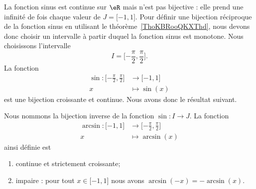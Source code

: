 	La fonction sinus est continue sur \( \eR\) mais n'est pas bijective : elle prend une infinité de fois chaque valeur de \( J=\mathopen[ -1 , 1 \mathclose]\). Pour définir une bijection réciproque de la fonction sinus en utilisant le théorème~\ref{ThoKBRooQKXThd}, nous devons donc choisir un intervalle à partir duquel la fonction sinus est monotone. Nous choisissons l'intervalle
	\begin{equation}
		I=\mathopen[ -\frac{ \pi }{ 2 } , \frac{ \pi }{2} \mathclose].
	\end{equation}
	La fonction
	\begin{equation}
		\begin{aligned}
			\sin\colon \mathopen[ -\frac{ \pi }{2} , \frac{ \pi }{2} \mathclose] & \to \mathopen[ -1 , 1 \mathclose] \\
			x                                                                    & \mapsto \sin(x)
		\end{aligned}
	\end{equation}
	est une bijection croissante et continue. Nous avons donc le résultat suivant.
	\begin{theorem}
		Nous nommons  la bijection inverse de la fonction \( \sin\colon I\to J\). La fonction
		\begin{equation}
			\begin{aligned}
				\arcsin\colon \mathopen[ -1 , 1 \mathclose] & \to \mathopen[ -\frac{ \pi }{2} , \frac{ \pi }{2} \mathclose] \\
				x                                           & \mapsto \arcsin(x)
			\end{aligned}
		\end{equation}
		ainsi définie est
		\begin{enumerate}
			\item
			      continue et strictement croissante;
			\item
			      impaire : pour tout \( x\in\mathopen[ -1 , 1 \mathclose]\) nous avons \( \arcsin(-x)=-\arcsin(x)\).
		\end{enumerate}
	\end{theorem}

